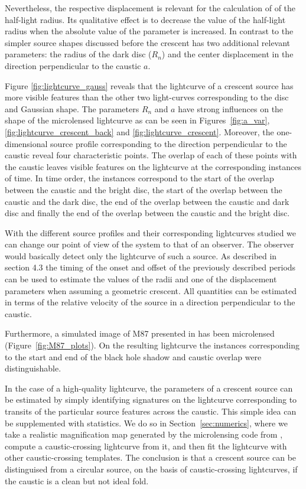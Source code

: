 \documentclass[usenatbib]{mn2e}
\begin{document}
Nevertheless, the respective displacement is relevant for the calculation of
of the half-light radius.  Its qualitative effect is to 
decrease the value of the
half-light radius when the absolute value of the parameter is
increased.  In contrast to the simpler source shapes discussed before the
crescent has two additional relevant parameters: the radius of the dark 
disc ($R_n$) and the center displacement in the direction
 perpendicular to the caustic $a$.

Figure \ref{fig:lightcurve_gauss} reveals that the lightcurve of a crescent source has more
visible features than the other two light-curves corresponding to the
disc and Gaussian shape. The parameters $R_n$ and $a$ have strong
influences on the shape of the microlensed lightcurve as can be seen
in Figures~\ref{fig:a_var}, \ref{fig:lightcurve_crescent_back} and
\ref{fig:lightcurve_crescent}.  Moreover, the one-dimensional
source profile corresponding to the direction perpendicular to the
caustic reveal four characteristic points. The overlap of each of
these points with the caustic leaves visible features on the
lightcurve at the corresponding instances of time. In time order,
the instances correspond to the start of the overlap between the
caustic and the bright disc, the start of the overlap between the
caustic and the dark disc, the end of the overlap between the caustic
and dark disc and finally the end of the overlap between the caustic
and the bright disc.

With the different source profiles and their corresponding lightcurves 
studied we can change our point of view of the system to that of an observer. 
The observer would basically detect only the lightcurve of such a source.
 As described in section 4.3 the timing of the onset and 
offset of the previously 
described periods can be used to estimate the values of the radii 
and one of the displacement parameters when assuming a geometric crescent. 
All quantities can be estimated in terms of the relative velocity 
of the source in a direction perpendicular to the caustic.


Furthermore, a simulated image of M87 presented in
\cite{2012MNRAS.421.1517D} has been microlensed
(Figure~\ref{fig:M87_plots}).  On the resulting lightcurve the
instances corresponding to the start and end of the black hole shadow
and caustic overlap were distinguishable.
    
In the case of a high-quality lightcurve, the parameters of a crescent
source can be estimated by simply identifying signatures on the
lightcurve corresponding to transits of the particular source features
across the caustic.  This simple idea can be supplemented with
statistics.  We do so in Section~\ref{sec:numerics}, where we take a
realistic magnification map generated by the microlensing code
from \cite{1999A&A...346L...5W}, compute a caustic-crossing lightcurve
from it, and then fit the lightcurve with other caustic-crossing
templates.  The conclusion is that a crescent source can be
distinguised from a circular source, on the basis of caustic-crossing
lightcurves, if the caustic is a clean but not ideal fold.
\end{document}
